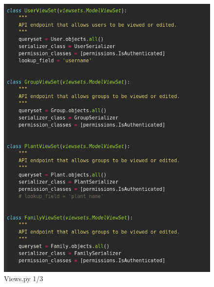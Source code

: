 \documentclass{article}
\begin{document}
     \begin{figure}[!htb]
        \centering
        \caption{Views.py 1/3}
        \includegraphics[scale=0.50]{views1}
    \end{figure}
\end{document}
